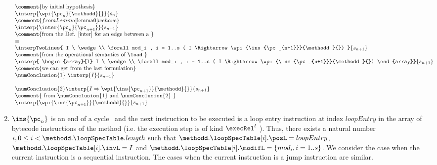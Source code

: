 \begin{enumerate}
$$ \begin{array}{l}
\mbox{\rm\comment{by initial hypothesis}} \\
\interp{\wpi{\pc_n}{\methodd}{}}{s_n} \\
\comment{from Lemma \ref{lemma0} we have }\\
\interp{\inter{\pc_n}{\pc_{n+1}}}{s_{n+1}} \\

 \mbox{\rm\comment{from the Def. \ref{inter} for an edge between a  }}\\				    
            \equiv \\
                 \interpTwoLines{  I \  \wedge\\
                                             \forall mod_i ,  i = 1..s ( I \Rightarrow \wpi{\ins{\pc_{n+1}}}{\methodd}{}) 
                                 }  { s_{n+1}  }\\

 \mbox{\rm\comment{from the operational semantics of \load }}\\

 \interp{ 
\begin{array}{l}   I \  \wedge\\
                  \forall mod_i ,  i = 1..s ( I \Rightarrow \wpi{\ins{\pc_{n+1}}}{\methodd}{}) 
\end{array}}{s_{n+1}}  \\


\mbox{\rm \comment{we can get from the last formulation}}\\
  \numConclusion{1} \   \interp{I}   {s_{n+1} } \\
                              \\
                 \numConclusion{2}  \interp{ I \Rightarrow \wpi{\ins{\pc_{n+1}}}{\methodd}{} }
                                     {s_{n+1}  } \\
\mbox{\rm \comment{ from \numConclusion{1}  and \numConclusion{2}  }}\\
  \interp{ \wpi{\ins{\pc_{n+1}}}{\methodd}{} }{s_{n+1}  }\\
\end{array} $$
\item $\ins{\pc_n} $ is an end of a cycle \ and the next instruction to be executed is a loop entry 
instruction at index $loopEntry $ in the array of bytecode instructions of the method \methodd
 (i.e. the execution step is of kind $\execRel^l$ ).
 Thus, there exists a natural number  $ i , 0 \le i < \methodd.\loopSpecTable.length   $   such that
 $ \methodd. \loopSpecTable[i].\posL = loopEntry $,  $ \methodd. \loopSpecTable[i].\invL = I $ and
   $ \methodd. \loopSpecTable[i].\modifL =\{ mod_i, i = 1..s \}$.
We consider the case when the current instruction is a sequential instruction. The cases when the current instruction 
is a jump instruction are similar.   \\ 
		

\end{enumerate}
